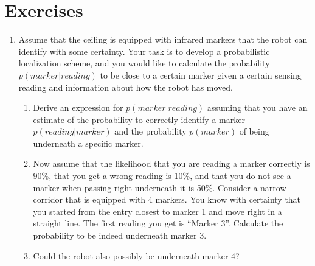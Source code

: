 \section*{Exercises}\small
\begin{enumerate}
\item Assume that the ceiling is equipped with infrared markers that the robot can identify with some certainty. Your task is to develop a probabilistic localization scheme, and you would like to calculate the probability $p(marker|reading)$ to be close to a certain marker given a certain sensing reading and information about how the robot has moved.
\begin{enumerate}
\item Derive an expression for $p(marker|reading)$ assuming that you have an estimate of the probability to correctly identify a marker $p(reading|marker)$ and the probability $p(marker)$ of being underneath a specific marker.
\item Now assume that the likelihood that you are reading a marker correctly is 90\%, that you get a wrong reading is 10\%, and that you do not see a marker when passing right underneath it is 50\%. Consider a narrow corridor that is equipped with 4 markers. You know with certainty that you started from the entry closest to marker 1 and move right in a straight line. The first reading you get is ``Marker 3''. Calculate the probability to be indeed underneath marker 3.
\item Could the robot also possibly be underneath marker 4?
\end{enumerate}
\end{enumerate}\normalsize
